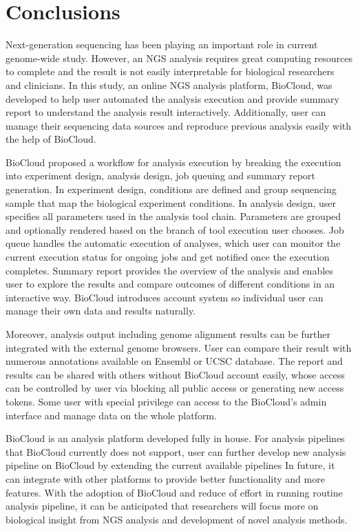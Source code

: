 \chapter{Conclusions}
\label{c:conclusion}

Next-generation sequencing has been playing an important role in current
genome-wide study. However, an NGS analysis requires great computing resources
to complete and the result is not easily interpretable for biological
researchers and clinicians. In this study, an online NGS analysis platform,
BioCloud, was developed to help user automated the analysis execution and
provide summary report to understand the analysis result interactively.
Additionally, user can manage their sequencing data sources and reproduce
previous analysis easily with the help of BioCloud.

BioCloud proposed a workflow for analysis execution by breaking the execution
into experiment design, analysis design, job queuing and summary report
generation. In experiment design, conditions are defined and group sequencing
sample that map the biological experiment conditions. In analysis design, user
specifies all parameters used in the analysis tool chain. Parameters are
grouped and optionally rendered based on the branch of tool execution user
chooses. Job queue handles the automatic execution of analyses, which user can
monitor the current execution status for ongoing jobs and get notified once the
execution completes. Summary report provides the overview of the analysis and
enables user to explore the results and compare outcomes of different
conditions in an interactive way. BioCloud introduces account system so
individual user can manage their own data and results naturally.

Moreover, analysis output including genome alignment results can be further
integrated with the external genome browsers. User can compare their result
with numerous annotations available on Ensembl or UCSC database. The report and
results can be shared with others without BioCloud account easily, whose access
can be controlled by user via blocking all public access or generating new
access tokens. Some user with special privilege can access to the BioCloud's
admin interface and manage data on the whole platform.

BioCloud is an analysis platform developed fully in house. For analysis
pipelines that BioCloud currently does not support, user can further develop
new analysis pipeline on BioCloud by extending the current available pipelines
In future, it can integrate with other platforms to provide better
functionality and more features. With the adoption of BioCloud and reduce of
effort in running routine analysis pipeline, it can be anticipated that
researchers will focus more on biological insight from NGS analysis and
development of novel analysis methods.


